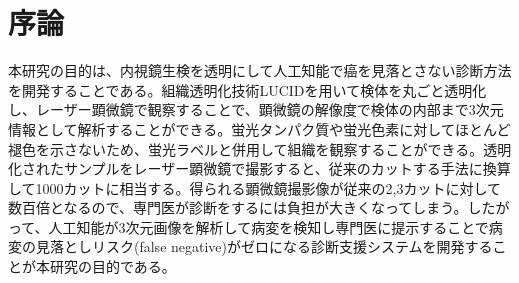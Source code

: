 \chapter{序論}
\label{chap_intro}

本研究の目的は、内視鏡生検を透明にして人工知能で癌を見落とさない診断方法を開発することである。組織透明化技術LUCIDを用いて検体を丸ごと透明化し、レーザー顕微鏡で観察することで、顕微鏡の解像度で検体の内部まで3次元情報として解析することができる。蛍光タンパク質や蛍光色素に対してほとんど褪色を示さないため、蛍光ラベルと併用して組織を観察することができる。透明化されたサンプルをレーザー顕微鏡で撮影すると、従来のカットする手法に換算して1000カットに相当する。得られる顕微鏡撮影像が従来の2,3カットに対して数百倍となるので、専門医が診断をするには負担が大きくなってしまう。したがって、人工知能が3次元画像を解析して病変を検知し専門医に提示することで病変の見落としリスク(false negative)がゼロになる診断支援システムを開発することが本研究の目的である。
